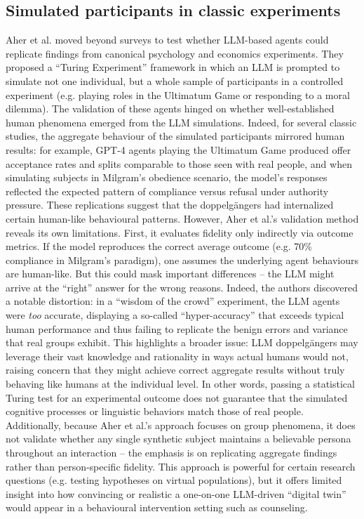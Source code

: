 \subsection{Simulated participants in classic experiments}
Aher et al. \cite{Aher2023} moved beyond surveys to test whether LLM-based agents could replicate findings from canonical psychology and economics experiments. They proposed a “Turing Experiment” framework in which an LLM is prompted to simulate not one individual, but a whole sample of participants in a controlled experiment (e.g. playing roles in the Ultimatum Game or responding to a moral dilemma). The validation of these agents hinged on whether well-established human phenomena emerged from the LLM simulations. Indeed, for several classic studies, the aggregate behaviour of the simulated participants mirrored human results: for example, GPT-4 agents playing the Ultimatum Game produced offer acceptance rates and splits comparable to those seen with real people, and when simulating subjects in Milgram’s obedience scenario, the model’s responses reflected the expected pattern of compliance versus refusal under authority pressure. These replications suggest that the doppelgängers had internalized certain human-like behavioural patterns. However, Aher et al.’s validation method reveals its own limitations. First, it evaluates fidelity only indirectly via outcome metrics. If the model reproduces the correct average outcome (e.g. 70\% compliance in Milgram’s paradigm), one assumes the underlying agent behaviours are human-like. But this could mask important differences – the LLM might arrive at the “right” answer for the wrong reasons. Indeed, the authors discovered a notable distortion: in a “wisdom of the crowd” experiment, the LLM agents were \emph{too} accurate, displaying a so-called “hyper-accuracy” that exceeds typical human performance and thus failing to replicate the benign errors and variance that real groups exhibit. This highlights a broader issue: LLM doppelgängers may leverage their vast knowledge and rationality in ways actual humans would not, raising concern that they might achieve correct aggregate results without truly behaving like humans at the individual level. In other words, passing a statistical Turing test for an experimental outcome does not guarantee that the simulated cognitive processes or linguistic behaviors match those of real people. Additionally, because Aher et al.’s approach focuses on group phenomena, it does not validate whether any single synthetic subject maintains a believable persona throughout an interaction – the emphasis is on replicating aggregate findings rather than person-specific fidelity. This approach is powerful for certain research questions (e.g. testing hypotheses on virtual populations), but it offers limited insight into how convincing or realistic a one-on-one LLM-driven “digital twin” would appear in a behavioural intervention setting such as counseling.

